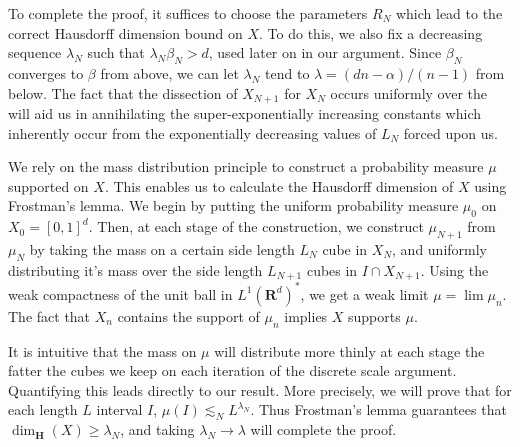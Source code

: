 \documentclass{article}
\theoremstyle{plain}
\theoremstyle{plain}
\begin{document}
To complete the proof, it suffices to choose the parameters $R_N$ which lead to the correct Hausdorff dimension bound on $X$. To do this, we also fix a decreasing sequence $\lambda_N$ such that $\lambda_N \beta_N > d$, used later on in our argument. Since $\beta_N$ converges to $\beta$ from above, we can let $\lambda_N$ tend to $\lambda = (dn - \alpha)/(n - 1)$ from below. The fact that the dissection of $X_{N+1}$ for $X_N$ occurs uniformly over the will aid us in annihilating the super-exponentially increasing constants which inherently occur from the exponentially decreasing values of $L_N$ forced upon us.

We rely on the mass distribution principle to construct a probability measure $\mu$ supported on $X$. This enables us to calculate the Hausdorff dimension of $X$ using Frostman's lemma. We begin by putting the uniform probability measure $\mu_0$ on $X_0 = [0,1]^d$. Then, at each stage of the construction, we construct $\mu_{N+1}$ from $\mu_N$ by taking the mass on a certain side length $L_N$ cube in $X_N$, and uniformly distributing it's mass over the side length $L_{N+1}$ cubes in $I \cap X_{N+1}$. Using the weak compactness of the unit ball in $L^1(\mathbf{R}^d)^*$, we get a weak limit $\mu = \lim \mu_n$. The fact that $X_n$ contains the support of $\mu_n$ implies $X$ supports $\mu$.

It is intuitive that the mass on $\mu$ will distribute more thinly at each stage the fatter the cubes we keep on each iteration of the discrete scale argument. Quantifying this leads directly to our result. More precisely, we will prove that for each length $L$ interval $I$, $\mu(I) \lesssim_N L^{\lambda_N}$. Thus Frostman's lemma guarantees that $\dim_{\mathbf{H}}(X) \geq \lambda_N$, and taking $\lambda_N \to \lambda$ will complete the proof.
\end{document}
